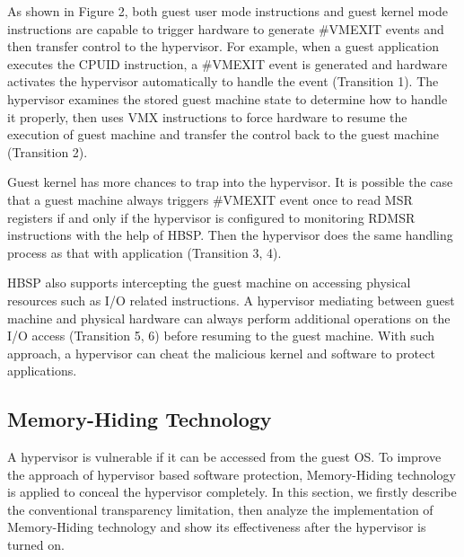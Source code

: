 \documentclass[conference]{IEEEtran}
\begin{document}
As shown in Figure 2, both guest user mode instructions and guest
kernel mode instructions are capable to trigger hardware to generate
\#VMEXIT events and then transfer control to the hypervisor. For
example, when a guest application executes the CPUID instruction, a
\#VMEXIT event is generated and hardware activates the hypervisor
automatically to handle the event (Transition 1). The hypervisor
examines the stored guest machine state to determine how to handle
it properly, then uses VMX instructions to force hardware to resume
the execution of guest machine and transfer the control back to the
guest machine (Transition 2).

Guest kernel has more chances to trap into the hypervisor. It is
possible the case that a guest machine always triggers \#VMEXIT
event once to read MSR registers if and only if the hypervisor is
configured to monitoring RDMSR instructions with the help of HBSP.
Then the hypervisor does the same handling process as that with
application (Transition 3, 4).

HBSP also supports intercepting the guest machine on accessing
physical resources such as I/O related instructions. A hypervisor
mediating between guest machine and physical hardware can always
perform additional operations on the I/O access (Transition 5, 6)
before resuming to the guest machine. With such approach, a
hypervisor can cheat the malicious kernel and software to protect
applications.

\subsection{Memory-Hiding Technology}
A hypervisor is vulnerable if it can be accessed from the guest OS.
To improve the approach of hypervisor based software protection,
Memory-Hiding technology is applied to conceal the hypervisor
completely. In this section, we firstly describe the conventional
transparency limitation, then analyze the implementation of
Memory-Hiding technology and show its effectiveness after the
hypervisor is turned on.
\end{document}

